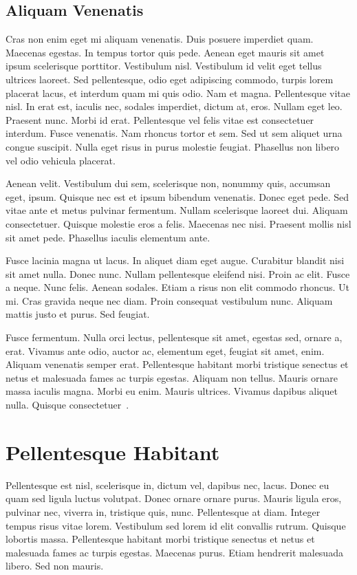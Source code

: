 \subsection{Aliquam Venenatis}

Cras non enim eget mi aliquam venenatis. Duis posuere imperdiet quam. Maecenas egestas. In tempus
tortor quis pede. Aenean eget mauris sit amet ipsum scelerisque porttitor. Vestibulum nisl.
Vestibulum id velit eget tellus ultrices laoreet. Sed pellentesque, odio eget adipiscing commodo,
turpis lorem placerat lacus, et interdum quam mi quis odio. Nam et magna. Pellentesque vitae nisl.
In erat est, iaculis nec, sodales imperdiet, dictum at, eros. Nullam eget leo. Praesent nunc. Morbi
id erat. Pellentesque vel felis vitae est consectetuer interdum. Fusce venenatis. Nam rhoncus tortor
et sem. Sed ut sem aliquet urna congue suscipit. Nulla eget risus in purus molestie feugiat.
Phasellus non libero vel odio vehicula placerat.

Aenean velit. Vestibulum dui sem, scelerisque non, nonummy quis, accumsan eget, ipsum. Quisque nec
est et ipsum bibendum venenatis. Donec eget pede. Sed vitae ante et metus pulvinar fermentum. Nullam
scelerisque laoreet dui. Aliquam consectetuer. Quisque molestie eros a felis. Maecenas nec nisi.
Praesent mollis nisl sit amet pede. Phasellus iaculis elementum ante.

Fusce lacinia magna ut lacus. In aliquet diam eget augue. Curabitur blandit nisi sit amet nulla.
Donec nunc. Nullam pellentesque eleifend nisi. Proin ac elit. Fusce a neque. Nunc felis. Aenean
sodales. Etiam a risus non elit commodo rhoncus. Ut mi. Cras gravida neque nec diam. Proin consequat
vestibulum nunc. Aliquam mattis justo et purus. Sed feugiat.

Fusce fermentum. Nulla orci lectus, pellentesque sit amet, egestas sed, ornare a, erat. Vivamus ante
odio, auctor ac, elementum eget, feugiat sit amet, enim. Aliquam venenatis semper erat. Pellentesque
habitant morbi tristique senectus et netus et malesuada fames ac turpis egestas. Aliquam non tellus.
Mauris ornare massa iaculis magna. Morbi eu enim. Mauris ultrices. Vivamus dapibus aliquet nulla.
Quisque consectetuer~\cite{Lamport:LDP85}.

\section{Pellentesque Habitant}

Pellentesque est nisl, scelerisque in, dictum vel, dapibus nec, lacus. Donec eu quam sed ligula
luctus volutpat. Donec ornare ornare purus. Mauris ligula eros, pulvinar nec, viverra in, tristique
quis, nunc. Pellentesque at diam. Integer tempus risus vitae lorem. Vestibulum sed lorem id elit
convallis rutrum. Quisque lobortis massa. Pellentesque habitant morbi tristique senectus et netus et
malesuada fames ac turpis egestas. Maecenas purus. Etiam hendrerit malesuada libero. Sed non mauris.

